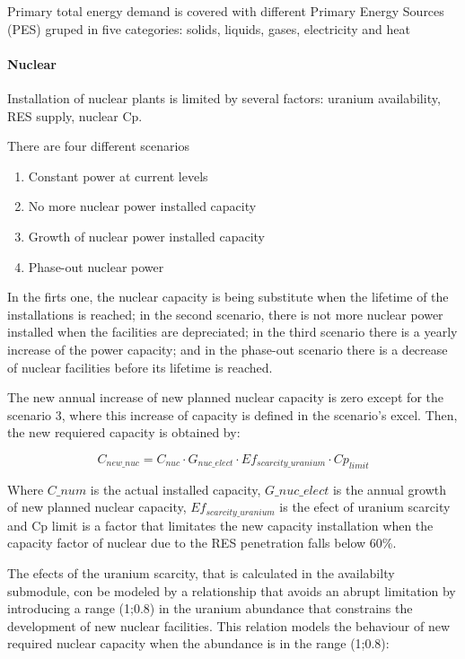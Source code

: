 Primary total energy demand is covered with different Primary Energy Sources (PES) gruped in five categories: solids, liquids, gases, electricity and heat

\paragraph{Nuclear}

Installation of nuclear plants is limited by several factors: uranium availability, RES supply, nuclear Cp.

There are four different scenarios
\begin{enumerate}
    \item Constant power at current levels
    \item No more nuclear power installed capacity
    \item Growth of nuclear power installed capacity
    \item Phase-out nuclear power
\end{enumerate}

In the firts one, the nuclear capacity is being substitute when the lifetime of the installations is reached; in the second scenario, there is not more nuclear power installed when the facilities are depreciated; in the third scenario there is a yearly increase of the power capacity; and in the phase-out scenario there is a decrease of nuclear facilities before its lifetime is reached.

The new annual increase of new planned nuclear capacity is zero except for the scenario 3, where this increase of capacity is defined in the scenario's excel. Then, the new requiered capacity is obtained by:

\begin{equation}
C_{new \_nuc}=   C_{nuc} \cdot G_{nuc\_elect} \cdot Ef_{scarcity\_uranium} \cdot Cp_{limit}
\end{equation}

Where $C\_num$ is the actual installed capacity, $G\_nuc\_elect$ is the annual growth of new planned nuclear capacity, $Ef_{scarcity\_uranium}$ is the efect of uranium scarcity and Cp limit is a factor that limitates the new capacity installation when the capacity factor of nuclear due to the RES penetration falls below 60\%.

The efects of the uranium scarcity, that is calculated in the availabilty submodule, con be modeled by a relationship that avoids an abrupt limitation by introducing a range (1;0.8) in the uranium abundance that constrains the development of new nuclear facilities. This relation models the behaviour of new required nuclear capacity when the abundance is in the range (1;0.8):

